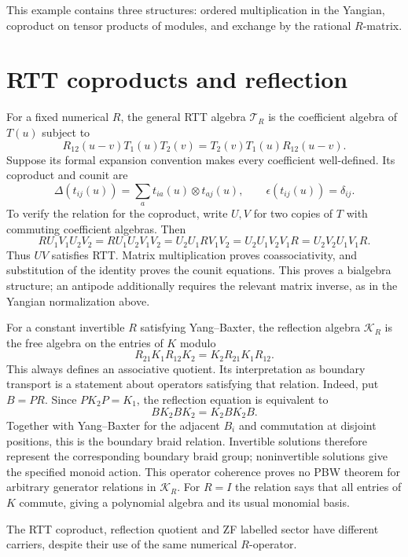 This example contains three structures: ordered multiplication in the Yangian, coproduct on tensor products of modules, and exchange by the rational $R$-matrix.


\section{RTT coproducts and reflection}
For a fixed numerical $R$, the general RTT algebra $\mathcal T_R$ is the
coefficient algebra of $T(u)$ subject to
\begin{equation}\label{eq:vol1-rtt-general}
 R_{12}(u-v)T_1(u)T_2(v)=T_2(v)T_1(u)R_{12}(u-v).
\end{equation}
Suppose its formal expansion convention makes every coefficient well-defined.
Its coproduct and counit are
\[
 \Delta(t_{ij}(u))=\sum_a t_{ia}(u)\otimes t_{aj}(u),
 \qquad\epsilon(t_{ij}(u))=\delta_{ij}.
\]
To verify the relation for the coproduct, write $U,V$ for two copies of $T$
with commuting coefficient algebras. Then
\[
 R U_1V_1U_2V_2
 =R U_1U_2V_1V_2
 =U_2U_1R V_1V_2
 =U_2U_1V_2V_1R
 =U_2V_2U_1V_1R.
\]
Thus $UV$ satisfies RTT. Matrix multiplication proves coassociativity, and
substitution of the identity proves the counit equations.
This proves a bialgebra structure; an antipode additionally requires the relevant
matrix inverse, as in the Yangian normalization above.

For a constant invertible $R$ satisfying Yang--Baxter, the reflection algebra
$\mathcal K_R$ is the free algebra on the entries of $K$ modulo
\begin{equation}\label{eq:vol1-reflection}
 R_{21}K_1R_{12}K_2=K_2R_{21}K_1R_{12}.
\end{equation}
This always defines an associative quotient. Its interpretation as boundary
transport is a statement about operators satisfying that relation.
Indeed, put $B=PR$. Since $PK_2P=K_1$, the reflection equation is equivalent to
\[
 BK_2BK_2=K_2BK_2B.
\]
Together with Yang--Baxter for the adjacent $B_i$ and commutation at disjoint
positions, this is the boundary braid relation. Invertible solutions therefore
represent the corresponding boundary braid group; noninvertible solutions give
the specified monoid action. This operator coherence proves no PBW theorem for
arbitrary generator relations in $\mathcal K_R$.
For $R=I$ the relation says that all entries of $K$ commute, giving a polynomial
algebra and its usual monomial basis.

The RTT coproduct, reflection quotient and ZF labelled sector have different
carriers, despite their use of the same numerical $R$-operator.

